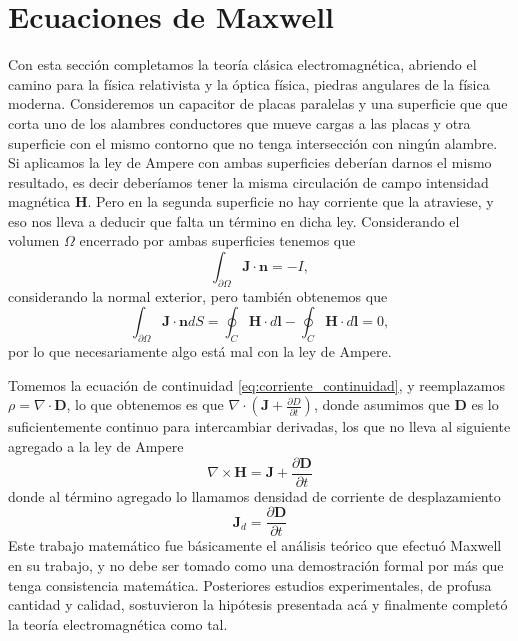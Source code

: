 \documentclass[11pt,a4paper]{article}
\numberwithin{equation}{section}
\begin{document}
\section{Ecuaciones de Maxwell}
\label{sec:ec_maxwell}
Con esta sección completamos la teoría clásica electromagnética, abriendo el camino para la física relativista y la óptica física, piedras angulares de la física moderna. Consideremos un capacitor de placas paralelas y una superficie que que corta uno de los alambres conductores que mueve cargas a las placas y otra superficie con el mismo contorno que no tenga intersección con ningún alambre. Si aplicamos la ley de Ampere con ambas superficies deberían darnos el mismo resultado, es decir deberíamos tener la misma circulación de campo intensidad magnética $\textbf{H}$. Pero en la segunda superficie no hay corriente que la atraviese, y eso nos lleva a deducir que falta un término en dicha ley. Considerando el volumen $\Omega$ encerrado por ambas superficies tenemos que \[\int_{\partial \Omega} \textbf{J} \cdot \textbf{n} = - I,\] considerando la normal exterior, pero también obtenemos que \[\int_{\partial \Omega} \textbf{J} \cdot \textbf{n} dS = \oint_{C} \textbf{H} \cdot d\textbf{l} - \oint_{C} \textbf{H} \cdot d\textbf{l} = 0,\] por lo que necesariamente algo está mal con la ley de Ampere. 

Tomemos la ecuación de continuidad \ref{eq:corriente_continuidad}, y reemplazamos $\rho = \nabla \cdot \textbf{D}$, lo que obtenemos es que $\nabla \cdot \left(\textbf{J} + \frac{\partial D}{\partial t}\right)$, donde asumimos que $\textbf{D}$ es lo suficientemente continuo para intercambiar derivadas, los que no lleva al siguiente agregado a la ley de Ampere
\begin{equation}
    \nabla \times \textbf{H} = \textbf{J} + \frac{\partial \textbf{D}}{\partial t}
    \label{eq:em_ampere}
\end{equation}
donde al término agregado lo llamamos densidad de corriente de desplazamiento
\begin{equation}
    \textbf{J}_d = \frac{\partial \textbf{D}}{\partial t}
    \label{eq:em_corriente_desplazamiento}
\end{equation}
Este trabajo matemático fue básicamente el análisis teórico que efectuó Maxwell en su trabajo, y no debe ser tomado como una demostración formal por más que tenga consistencia matemática. Posteriores estudios experimentales, de profusa cantidad y calidad, sostuvieron la hipótesis presentada acá y finalmente completó la teoría electromagnética como tal. 
\end{document}
